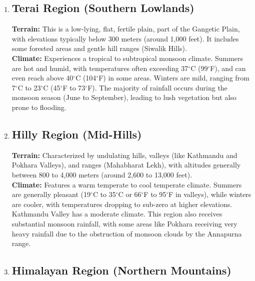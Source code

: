 \begin{enumerate}

\item \subsection*{Terai Region (Southern Lowlands)}

\textbf{Terrain:} This is a low-lying, flat, fertile plain, part of the Gangetic Plain, with elevations typically below 300 meters (around 1,000 feet). It includes some forested areas and gentle hill ranges (Siwalik Hills).\\
\textbf{Climate:} Experiences a tropical to subtropical monsoon climate. Summers are hot and humid, with temperatures often exceeding 37$^\circ$C (99$^\circ$F), and can even reach above 40$^\circ$C (104$^\circ$F) in some areas. Winters are mild, ranging from 7$^\circ$C to 23$^\circ$C (45$^\circ$F to 73$^\circ$F). The majority of rainfall occurs during the monsoon season (June to September), leading to lush vegetation but also prone to flooding.

\item \subsection*{Hilly Region (Mid-Hills)}

\textbf{Terrain:} Characterized by undulating hills, valleys (like Kathmandu and Pokhara Valleys), and ranges (Mahabharat Lekh), with altitudes generally between 800 to 4,000 meters (around 2,600 to 13,000 feet).\\
\textbf{Climate:} Features a warm temperate to cool temperate climate. Summers are generally pleasant (19$^\circ$C to 35$^\circ$C or 66$^\circ$F to 95$^\circ$F in valleys), while winters are cooler, with temperatures dropping to sub-zero at higher elevations. Kathmandu Valley has a moderate climate. This region also receives substantial monsoon rainfall, with some areas like Pokhara receiving very heavy rainfall due to the obstruction of monsoon clouds by the Annapurna range.

\item \subsection*{Himalayan Region (Northern Mountains)}


\end{enumerate}

